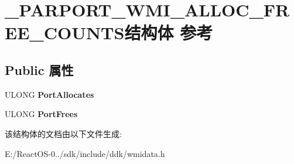 \hypertarget{struct___p_a_r_p_o_r_t___w_m_i___a_l_l_o_c___f_r_e_e___c_o_u_n_t_s}{}\section{\+\_\+\+P\+A\+R\+P\+O\+R\+T\+\_\+\+W\+M\+I\+\_\+\+A\+L\+L\+O\+C\+\_\+\+F\+R\+E\+E\+\_\+\+C\+O\+U\+N\+T\+S结构体 参考}
\label{struct___p_a_r_p_o_r_t___w_m_i___a_l_l_o_c___f_r_e_e___c_o_u_n_t_s}
\subsection*{Public 属性}
\begin{DoxyCompactItemize}
\item 
\mbox{\label{struct___p_a_r_p_o_r_t___w_m_i___a_l_l_o_c___f_r_e_e___c_o_u_n_t_s_a9332235669c1eeb113d78a509ef7c72e}} 
U\+L\+O\+NG {\bfseries Port\+Allocates}
\item 
\mbox{\label{struct___p_a_r_p_o_r_t___w_m_i___a_l_l_o_c___f_r_e_e___c_o_u_n_t_s_a49ec59e7c2e774bcae07eb03cdfcff25}} 
U\+L\+O\+NG {\bfseries Port\+Frees}
\end{DoxyCompactItemize}


该结构体的文档由以下文件生成\+:\begin{DoxyCompactItemize}
\item 
E\+:/\+React\+O\+S-\/0../sdk/include/ddk/wmidata.\+h\end{DoxyCompactItemize}
